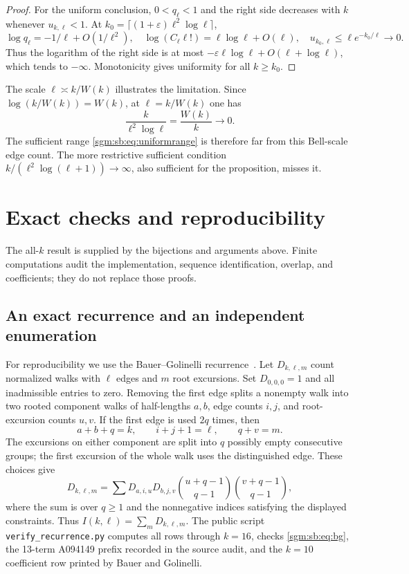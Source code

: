 \documentclass[11pt,letterpaper]{article}
\theoremstyle{remark}\newtheorem{remark}[theorem]{Remark}
\theoremstyle{definition}\newtheorem{definition}[theorem]{Definition}
\begin{document}
\begin{proof}
For the uniform conclusion, $0<q_\ell<1$ and the right side decreases with $k$ whenever $u_{k,\ell}<1$. At $k_0=\lceil(1+\varepsilon)\ell^2\log\ell\rceil$,
\[
 \log q_\ell=-1/\ell+O(1/\ell^2),\quad
 \log(C_\ell\ell!)=\ell\log\ell+O(\ell),\quad
 u_{k_0,\ell}\le\ell e^{-k_0/\ell}\to0.
\]
Thus the logarithm of the right side is at most
$-\varepsilon\ell\log\ell+O(\ell+\log\ell)$, which tends to $-\infty$. Monotonicity gives uniformity for all $k\ge k_0$.
\end{proof}

The scale $\ell\asymp k/W(k)$ illustrates the limitation. Since $\log(k/W(k))=W(k)$, at $\ell=k/W(k)$ one has
\[
 \frac{k}{\ell^2\log\ell}=\frac{W(k)}{k}\longrightarrow0.
\]
The sufficient range \eqref{sgm:sb:eq:uniformrange} is therefore far from this Bell-scale edge count. The more restrictive sufficient condition $k/(\ell^2\log(\ell+1))\to\infty$, also sufficient for the proposition, misses it.

\section{Exact checks and reproducibility}\label{sgm:sb:sec:repro}
The all-$k$ result is supplied by the bijections and arguments above. Finite computations audit the implementation, sequence identification, overlap, and coefficients; they do not replace those proofs.

\subsection{An exact recurrence and an independent enumeration}
For reproducibility we use the Bauer--Golinelli recurrence~\cite[\S5.4, Eq.\ (8)]{bg}. Let $D_{k,\ell,m}$ count normalized walks with $\ell$ edges and $m$ root excursions. Set $D_{0,0,0}=1$ and all inadmissible entries to zero. Removing the first edge splits a nonempty walk into two rooted component walks of half-lengths $a,b$, edge counts $i,j$, and root-excursion counts $u,v$. If the first edge is used $2q$ times, then
\[
 a+b+q=k,\qquad i+j+1=\ell,\qquad q+v=m.
\]
The excursions on either component are split into $q$ possibly empty consecutive groups; the first excursion of the whole walk uses the distinguished edge. These choices give
\begin{equation}\label{sgm:sb:eq:recurrence}
 D_{k,\ell,m}=\sum
 D_{a,i,u}D_{b,j,v}
 \binom{u+q-1}{q-1}\binom{v+q-1}{q-1},
\end{equation}
where the sum is over $q\ge1$ and the nonnegative indices satisfying the displayed constraints. Thus $I(k,\ell)=\sum_mD_{k,\ell,m}$. The public script \texttt{verify\_recurrence.py} computes all rows through $k=16$, checks \eqref{sgm:sb:eq:bg}, the 13-term A094149 prefix recorded in the source audit, and the $k=10$ coefficient row printed by Bauer and Golinelli.
\end{document}
